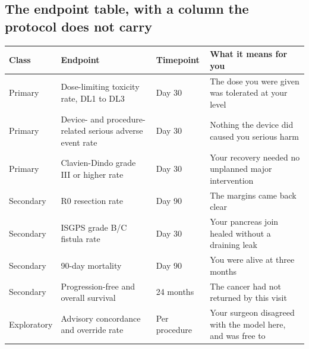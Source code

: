 
\subsection{The endpoint table, with a column the protocol does not carry}


\vspace{0.30em}

\noindent\begin{tabularx}{\textwidth}{L{2.4cm} L{4.1cm} C{2.0cm} Y}
\toprule
\textbf{Class} & \textbf{Endpoint} & \textbf{Timepoint} & \textbf{What it means for you} \\
\midrule
Primary & Dose-limiting toxicity rate, DL1 to DL3 & Day 30 & The dose you were given was tolerated at your level \\
Primary & Device- and procedure-related serious adverse event rate & Day 30 & Nothing the device did caused you serious harm \\
Primary & Clavien-Dindo grade III or higher rate & Day 30 & Your recovery needed no unplanned major intervention \\
Secondary & R0 resection rate & Day 90 & The margins came back clear \\
Secondary & ISGPS grade B/C fistula rate & Day 30 & Your pancreas join healed without a draining leak \\
Secondary & 90-day mortality & Day 90 & You were alive at three months \\
Secondary & Progression-free and overall survival & 24 months & The cancer had not returned by this visit \\
Exploratory & Advisory concordance and override rate & Per procedure & Your surgeon disagreed with the model here, and was free to \\
\bottomrule
\end{tabularx}

